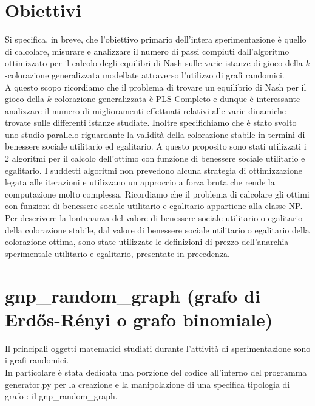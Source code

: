 \section{Obiettivi}
\justify
Si specifica, in breve, che l'obiettivo primario dell'intera sperimentazione è quello di calcolare, misurare e analizzare il numero di passi compiuti dall'algoritmo ottimizzato per il calcolo degli equilibri di Nash sulle varie istanze di gioco della $k$-colorazione generalizzata modellate attraverso l'utilizzo di grafi randomici.\\
A questo scopo ricordiamo che il problema di trovare un equilibrio di Nash per il gioco della $k$-colorazione generalizzata è PLS-Completo e dunque è interessante analizzare il numero di miglioramenti effettuati relativi alle varie dinamiche trovate sulle differenti istanze studiate.
Inoltre specifichiamo che è stato svolto uno studio parallelo riguardante la validità della colorazione stabile in termini di benessere sociale utilitario ed egalitario. A questo proposito sono stati utilizzati i 2 algoritmi per il calcolo dell'ottimo con funzione di benessere sociale utilitario e egalitario. I suddetti algoritmi non prevedono alcuna strategia di ottimizzazione legata alle iterazioni e utilizzano un approccio a forza bruta che rende la computazione molto complessa. Ricordiamo che il problema di calcolare gli ottimi con funzioni di benessere sociale utilitario e egalitario appartiene alla classe NP.\\
Per descrivere la lontananza del valore di benessere sociale utilitario o egalitario della colorazione stabile, dal valore di benessere sociale utilitario o egalitario della colorazione ottima, sono state utilizzate le definizioni di prezzo dell'anarchia sperimentale utilitario e egalitario, presentate in precedenza.\\

\section{gnp\_random\_graph (grafo di Erdős-Rényi o grafo binomiale)}
\justify
Il principali oggetti matematici studiati durante l'attività di sperimentazione sono i grafi randomici.\\

In particolare è stata dedicata una porzione del codice all'interno del programma generator.py per la creazione e la manipolazione di una specifica tipologia di grafo : il gnp\_random\_graph.\\

